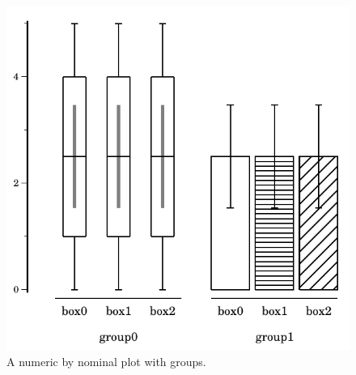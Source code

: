 \documentclass{article}
\begin{document}
\begin{figure}[t]
\begin{center}
\includegraphics{num_by_nom}
\caption{\label{fig:num_by_nom}A numeric by nominal plot with groups.}
\end{center}
\end{figure}
\end{document}
